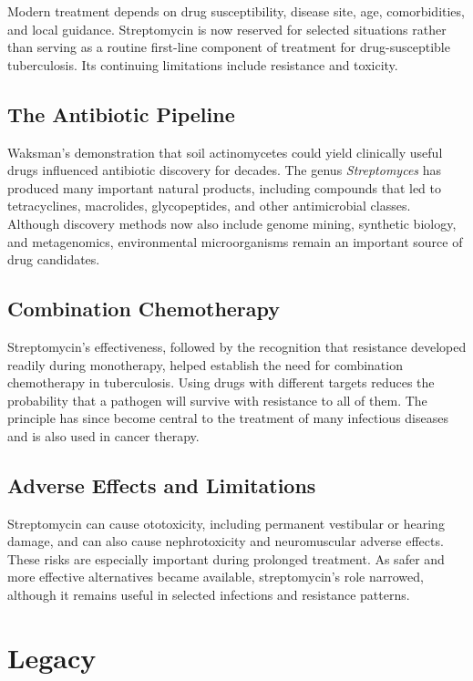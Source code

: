 Modern treatment depends on drug susceptibility, disease site, age, comorbidities, and local guidance. Streptomycin is now reserved for selected situations rather than serving as a routine first-line component of treatment for drug-susceptible tuberculosis. Its continuing limitations include resistance and toxicity.

\subsection{The Antibiotic Pipeline}

Waksman's demonstration that soil actinomycetes could yield clinically useful drugs influenced antibiotic discovery for decades. The genus \textit{Streptomyces} has produced many important natural products, including compounds that led to tetracyclines, macrolides, glycopeptides, and other antimicrobial classes. Although discovery methods now also include genome mining, synthetic biology, and metagenomics, environmental microorganisms remain an important source of drug candidates.

\subsection{Combination Chemotherapy}

Streptomycin's effectiveness, followed by the recognition that resistance developed readily during monotherapy, helped establish the need for combination chemotherapy in tuberculosis. Using drugs with different targets reduces the probability that a pathogen will survive with resistance to all of them. The principle has since become central to the treatment of many infectious diseases and is also used in cancer therapy.

\subsection{Adverse Effects and Limitations}

Streptomycin can cause ototoxicity, including permanent vestibular or hearing damage, and can also cause nephrotoxicity and neuromuscular adverse effects. These risks are especially important during prolonged treatment. As safer and more effective alternatives became available, streptomycin's role narrowed, although it remains useful in selected infections and resistance patterns.

\section{Legacy}

